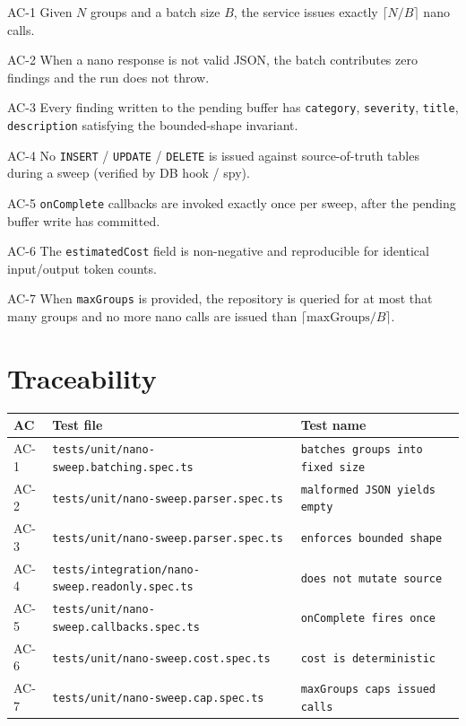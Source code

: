 \begin{ac}{AC-1}
Given $N$ groups and a batch size $B$, the service issues exactly $\lceil N / B \rceil$ nano calls.
\end{ac}
\begin{ac}{AC-2}
When a nano response is not valid JSON, the batch contributes zero findings and the run does not throw.
\end{ac}
\begin{ac}{AC-3}
Every finding written to the pending buffer has \texttt{category}, \texttt{severity}, \texttt{title}, \texttt{description} satisfying the bounded-shape invariant.
\end{ac}
\begin{ac}{AC-4}
No \texttt{INSERT} / \texttt{UPDATE} / \texttt{DELETE} is issued against source-of-truth tables during a sweep (verified by DB hook / spy).
\end{ac}
\begin{ac}{AC-5}
\texttt{onComplete} callbacks are invoked exactly once per sweep, after the pending buffer write has committed.
\end{ac}
\begin{ac}{AC-6}
The \texttt{estimatedCost} field is non-negative and reproducible for identical input/output token counts.
\end{ac}
\begin{ac}{AC-7}
When \texttt{maxGroups} is provided, the repository is queried for at most that many groups and no more nano calls are issued than $\lceil \text{maxGroups} / B \rceil$.
\end{ac}

\section{Traceability}

\begin{center}
\begin{tabular}{@{}lll@{}}
\toprule
AC & Test file & Test name \\
\midrule
AC-1 & \texttt{tests/unit/nano-sweep.batching.spec.ts}   & \texttt{batches groups into fixed size} \\
AC-2 & \texttt{tests/unit/nano-sweep.parser.spec.ts}     & \texttt{malformed JSON yields empty} \\
AC-3 & \texttt{tests/unit/nano-sweep.parser.spec.ts}     & \texttt{enforces bounded shape} \\
AC-4 & \texttt{tests/integration/nano-sweep.readonly.spec.ts} & \texttt{does not mutate source} \\
AC-5 & \texttt{tests/unit/nano-sweep.callbacks.spec.ts}  & \texttt{onComplete fires once} \\
AC-6 & \texttt{tests/unit/nano-sweep.cost.spec.ts}       & \texttt{cost is deterministic} \\
AC-7 & \texttt{tests/unit/nano-sweep.cap.spec.ts}        & \texttt{maxGroups caps issued calls} \\
\bottomrule
\end{tabular}
\end{center}


